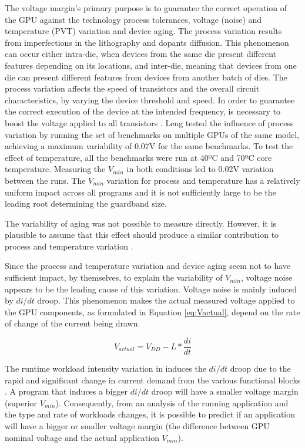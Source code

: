 The voltage margin's primary purpose is to guarantee the correct operation of the GPU against the technology process tolerances, voltage (noise) and temperature (PVT) variation and device aging.
The process variation results from imperfections in the lithography and dopants diffusion. This phenomenon can occur either intra-die, when devices from the same die present different features depending on its locations, and inter-die, meaning that devices from one die can present different features from devices from another batch of dies. The process variation affects the speed of transistors and the overall circuit characteristics, by varying the device threshold and speed. In order to guarantee the correct execution of the device at the intended frequency, is necessary to boost the voltage applied to all transistors \cite{thomas_core_2016}.
Leng tested the influence of process variation by running the set of benchmarks on multiple GPUs of the same model, achieving a maximum variability of 0.07V for the same benchmarks. To test the effect of temperature, all the benchmarks were run at 40ºC and 70ºC core temperature. Measuring the $V_{min}$ in both conditions led to 0.02V variation between the runs. The  $V_{min}$ variation for process and temperature has a relatively uniform impact across all programs and it is not sufficiently large to be the leading root determining the guardband size. 

The variability of aging was not possible to measure directly. However, it is plausible to assume that this effect should produce a similar contribution to process and temperature variation \cite{leng_safe_2015}.

Since the process and temperature variation and device aging seem not to have sufficient impact, by themselves, to explain the variability of $V_{min}$, voltage noise appears to be the leading cause of this variation. Voltage noise is mainly induced by $di/dt$ droop. This phenomenon makes the actual measured voltage applied to the GPU components, as formulated in Equation \ref{eq:Vactual}, depend on the rate of change of the current being drawn. 

\begin{equation}
    \label{eq:Vactual}
    V_{actual} = V_{DD}-L*\frac{di}{dt}
\end{equation}

The runtime workload intensity variation in induces the $di/dt$ droop due to the rapid and significant change in current demand from the various functional blocks \cite{thomas_core_2016}. A program that induces a bigger $di/dt$ droop will have a smaller voltage margin (superior $V_{min}$). Consequently, from an analysis of the running application and the type and rate of workloads changes, it is possible to predict if an application will have a bigger or smaller voltage margin (the difference between GPU nominal voltage and the actual application $V_{min}$).


